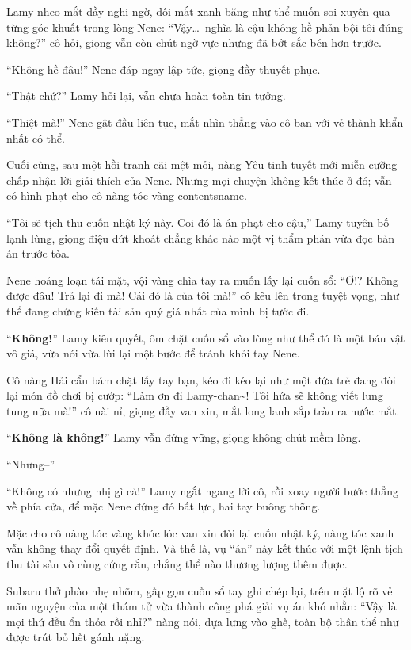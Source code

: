 \documentclass[../main.tex]{subfiles}
\begin{document}
Lamy nheo mắt đầy nghi ngờ, đôi mắt xanh băng như thể muốn soi xuyên qua từng góc khuất trong lòng Nene: ``Vậy\dots\ nghĩa là cậu không hề phản bội tôi đúng không?'' cô hỏi, giọng vẫn còn chút ngờ vực nhưng đã bớt sắc bén hơn trước.

``Không hề đâu!'' Nene đáp ngay lập tức, giọng đầy thuyết phục.

``Thật chứ?'' Lamy hỏi lại, vẫn chưa hoàn toàn tin tưởng.

``Thiệt mà!'' Nene gật đầu liên tục, mắt nhìn thẳng vào cô bạn với vẻ thành khẩn nhất có thể.

Cuối cùng, sau một hồi tranh cãi mệt mỏi, nàng Yêu tinh tuyết mới miễn cưỡng chấp nhận lời giải thích của Nene. Nhưng mọi chuyện không kết thúc ở đó; vẫn có hình phạt cho cô nàng tóc vàng-contentsname.

``Tôi sẽ tịch thu cuốn nhật ký này. Coi đó là án phạt cho cậu,'' Lamy tuyên bố lạnh lùng, giọng điệu dứt khoát chẳng khác nào một vị thẩm phán vừa đọc bản án trước tòa.

Nene hoảng loạn tái mặt, vội vàng chìa tay ra muốn lấy lại cuốn sổ: ``Ơ!? Không được đâu! Trả lại đi mà! Cái đó là của tôi mà!'' cô kêu lên trong tuyệt vọng, như thể đang chứng kiến tài sản quý giá nhất của mình bị tước đi.

``\textbf{Không!}'' Lamy kiên quyết, ôm chặt cuốn sổ vào lòng như thể đó là một báu vật vô giá, vừa nói vừa lùi lại một bước để tránh khỏi tay Nene.

Cô nàng Hải cẩu bám chặt lấy tay bạn, kéo đi kéo lại như một đứa trẻ đang đòi lại món đồ chơi bị cướp: ``Làm ơn đi Lamy-chan\~{}! Tôi hứa sẽ không viết lung tung nữa mà!'' cô nài nỉ, giọng đầy van xin, mắt long lanh sắp trào ra nước mắt.

``\textbf{Không là không!}'' Lamy vẫn đứng vững, giọng không chút mềm lòng.

``Nhưng--''

``Không có nhưng nhị gì cả!'' Lamy ngắt ngang lời cô, rồi xoay người bước thẳng về phía cửa, để mặc Nene đứng đó bất lực, hai tay buông thõng.

Mặc cho cô nàng tóc vàng khóc lóc van xin đòi lại cuốn nhật ký, nàng tóc xanh vẫn không thay đổi quyết định. Và thế là, vụ ``án'' này kết thúc với một lệnh tịch thu tài sản vô cùng cứng rắn, chẳng thể nào thương lượng thêm được.


Subaru thở phào nhẹ nhõm, gấp gọn cuốn sổ tay ghi chép lại, trên mặt lộ rõ vẻ mãn nguyện của một thám tử vừa thành công phá giải vụ án khó nhằn: ``Vậy là mọi thứ đều ổn thỏa rồi nhỉ?'' nàng nói, dựa lưng vào ghế, toàn bộ thân thể như được trút bỏ hết gánh nặng.
\end{document}
